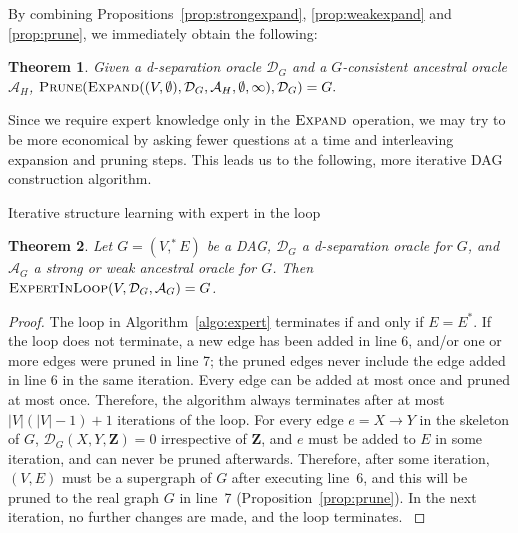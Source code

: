 \documentclass[accepted]{uai2025} %
\newtheorem{theorem}{Theorem}
\begin{document}
By combining Propositions~\ref{prop:strongexpand}, \ref{prop:weakexpand} and 
\ref{prop:prune}, we immediately obtain the following:

\begin{theorem}
Given a d-separation oracle $\mathcal{D}_G$ and a $G$-consistent 
ancestral oracle $\mathcal{A}_H$, 
$\textsc{Prune}(\textsc{Expand}((V,\emptyset),\mathcal{D}_G,\mathcal{A}_H,\emptyset,\infty),\mathcal{D}_G)=G.$
\end{theorem}

Since we require expert knowledge only in the $\textsc{Expand}$ 
operation, we may try to be more economical by asking fewer 
questions at a time and interleaving expansion and
pruning steps. This leads us to the following, more iterative 
DAG construction algorithm.

\begin{algorithm}[h]
\DontPrintSemicolon
\SetAlgoLined
{}


\caption{Iterative structure learning with expert in the loop}
\label{algo:expert}
\end{algorithm} 

\begin{theorem}
Let $G=(V,^*E)$ be a DAG, $\mathcal{D}_G$ a d-separation oracle for $G$, and 
$\mathcal{A}_G$ a strong or weak ancestral oracle for $G$. Then 
$\textsc{ExpertInLoop}(V,\mathcal{D}_G,\mathcal{A}_G)=G$.
\end{theorem}

\begin{proof}
The loop in Algorithm~\ref{algo:expert} terminates if and 
only if $E=E^*$. If the loop does not  terminate, a new
 edge has been added in line 6, and/or one or more edges were 
pruned in line 7; the pruned edges never include the edge added 
in line 6 in the same iteration. Every edge can be added at 
most once and pruned at most once. Therefore, the algorithm 
always terminates after at most $|V|(|V|-1)+1$ iterations of
the loop. For every edge $e=X\to Y $ in the skeleton of $G$, 
$\mathcal{D}_G(X,Y,\mathbf{Z})=0$ irrespective of $\mathbf{Z}$, 
and $e$ must be added to $E$ in some iteration, and can never 
be pruned afterwards. Therefore, after some iteration, 
$(V,E)$ must be a supergraph of $G$ after executing line~6, 
and this will be pruned to the real graph $G$ in line~7 
(Proposition~\ref{prop:prune}). In the next iteration, 
no further changes are made, and the loop terminates.
\label{thm:itworks}
\end{proof} 
\end{document}
